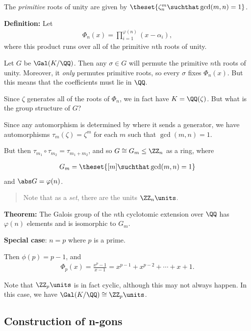 The \emph{primitive} roots of unity are given by
\(\theset{\zeta_n^m \suchthat \gcd(m, n) = 1}\).

\textbf{Definition:} Let
\begin{align*}
\Phi_n(x) = \prod_{i=1}^{\varphi(n)} (x-\alpha_i)
,\end{align*} where this product runs over all of the primitive \(n\)th
roots of unity.

Let \(G\) be \(\Gal(K/\QQ)\). Then any \(\sigma\in G\) will permute the
primitive \(n\)th roots of unity. Moreover, it \emph{only} permutes
primitive roots, so every \(\sigma\) fixes \(\Phi_n(x)\). But this means
that the coefficients must lie in \(\QQ\).

Since \(\zeta\) generates all of the roots of \(\Phi_n\), we in fact
have \(K = \QQ(\zeta)\). But what is the group structure of \(G\)?

Since any automorphism is determined by where it sends a generator, we
have automorphisms \(\tau_m(\zeta) = \zeta^m\) for each \(m\) such that
\(\gcd(m, n) = 1\).

But then \(\tau_{m_1} \circ \tau_{m_2} = \tau_{m_1 + m_2}\), and so
\(G \cong G_m \leq \ZZ_n\) as a ring, where

\begin{align*}
G_m = \theset{[m] \suchthat \gcd(m, n) = 1}
\end{align*} and \(\abs G = \varphi(n)\).

\begin{quote}
Note that as a \emph{set}, there are the units \(\ZZ_n\units\).
\end{quote}

\textbf{Theorem:} The Galois group of the \(n\)th cyclotomic extension
over \(\QQ\) has \(\varphi(n)\) elements and is isomorphic to \(G_m\).

\textbf{Special case}: \(n=p\) where \(p\) is a prime.

Then \(\phi(p) = p-1\), and
\begin{align*}
\Phi_p(x) = \frac{x^p - 1}{x-1} = x^{p-1} + x^{p-2} + \cdots + x + 1
.\end{align*}

Note that \(\ZZ_p\units\) is in fact cyclic, although this may not
always happen. In this case, we have \(\Gal(K/\QQ) \cong \ZZ_p\units\).

\hypertarget{construction-of-n-gons}{%
\subsection{Construction of n-gons}\label{construction-of-n-gons}}

